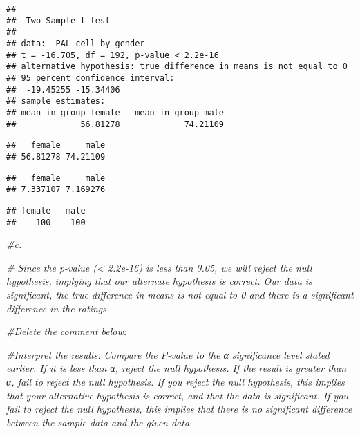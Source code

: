 \documentclass[
]{article}
\newenvironment{Shaded}{\begin{snugshade}}{\end{snugshade}}
\newcommand{\CommentTok}[1]{\textcolor[rgb]{0.56,0.35,0.01}{\textit{#1}}}
\newcommand{\DataTypeTok}[1]{\textcolor[rgb]{0.13,0.29,0.53}{#1}}
\newcommand{\KeywordTok}[1]{\textcolor[rgb]{0.13,0.29,0.53}{\textbf{#1}}}
\newcommand{\NormalTok}[1]{#1}
\newcommand{\OperatorTok}[1]{\textcolor[rgb]{0.81,0.36,0.00}{\textbf{#1}}}
\newcommand{\OtherTok}[1]{\textcolor[rgb]{0.56,0.35,0.01}{#1}}
\newcommand{\StringTok}[1]{\textcolor[rgb]{0.31,0.60,0.02}{#1}}
\begin{document}
\begin{verbatim}
## 
##  Two Sample t-test
## 
## data:  PAL_cell by gender
## t = -16.705, df = 192, p-value < 2.2e-16
## alternative hypothesis: true difference in means is not equal to 0
## 95 percent confidence interval:
##  -19.45255 -15.34406
## sample estimates:
## mean in group female   mean in group male 
##             56.81278             74.21109
\end{verbatim}

\begin{Shaded}
\end{Shaded}

\begin{verbatim}
##   female     male 
## 56.81278 74.21109
\end{verbatim}

\begin{verbatim}
##   female     male 
## 7.337107 7.169276
\end{verbatim}

\begin{verbatim}
## female   male 
##    100    100
\end{verbatim}

\begin{Shaded}
\begin{Highlighting}[]
\CommentTok{#c.}

\CommentTok{# Since the p-value (< 2.2e-16) is less than 0.05, we will reject the null hypothesis, implying that our alternate hypothesis is correct. Our data is significant, the true difference in means is not equal to 0 and there is a significant difference in the ratings.}

\CommentTok{#Delete the comment below:}

\CommentTok{#Interpret the results. Compare the P-value to the α significance level stated earlier. If it is less than α, reject the null hypothesis. If the result is greater than α, fail to reject the null hypothesis. If you reject the null hypothesis, this implies that your alternative hypothesis is correct, and that the data is significant. If you fail to reject the null hypothesis, this implies that there is no significant difference between the sample data and the given data.}
\end{Highlighting}
\end{Shaded}
\end{document}
